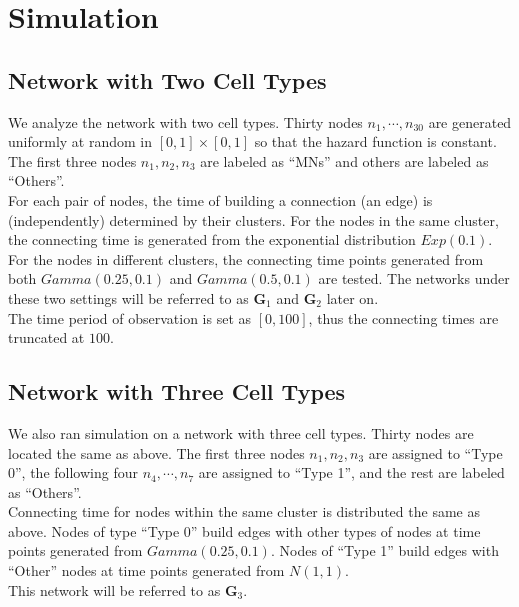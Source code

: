 \section{Simulation}
\subsection{Network with Two Cell Types}
We analyze the network with two cell types.
Thirty nodes $n_1,\cdots,n_{30}$ are generated uniformly at random in $[0,1]\times[0,1]$ so that the hazard function is constant. The first three nodes $n_1,n_2,n_3$  are labeled as ``MNs'' and others are labeled as ``Others''.
\\
For each pair of nodes, the time of building a connection (an edge) is (independently) determined by their clusters. For the nodes in the same cluster, the connecting time is generated from the exponential distribution $Exp(0.1)$. For the nodes in different clusters, the connecting time points generated from both $Gamma(0.25, 0.1)$ and $Gamma(0.5, 0.1)$ are tested. The networks under these two settings will be referred to as $\mathbf{G}_1$ and $\mathbf{G}_2$ later on.
\\
The time period of observation is set as $[0,100]$, thus the connecting times are truncated at $100$.
\\

\subsection{Network with Three Cell Types}
We also ran simulation on a network with three cell types.
Thirty nodes are located the same as above. The first three nodes $n_1,n_2,n_3$ are assigned to ``Type 0'', the following four $n_4,\cdots,n_7$ are assigned to ``Type 1'', and the rest are labeled as ``Others''.
\\
Connecting time for nodes within the same cluster is distributed the same as above. Nodes of type ``Type 0'' build edges with other types of nodes at time points generated from $Gamma(0.25,0.1)$. Nodes of ``Type 1'' build edges with ``Other'' nodes at time points generated from $N(1,1)$. 
\\
This network will be referred to as $\mathbf{G}_3$. 

